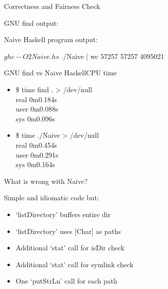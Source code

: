 \documentclass[17pt]{beamer}
\begin{document}
\begin{frame}[fragile]{Correctness and Fairness Check}{}

GNU find output:

Naive Haskell program output:
\begin{code}
$ ghc -O2 Naive.hs
$ ./Naive | wc
57257   57257 4095021
\end{code}
\end{frame}

\begin{frame}{GNU find vs Naive Haskell}{CPU time}

\begin{itemize}
  \item \$ time find . > /dev/null \\
real    0m0.184s \\
user    0m0.088s \\
sys     0m0.096s \\

\item \$ time ./Naive > /dev/null \\
real    0m0.454s \\
user    0m0.291s \\
sys     0m0.164s \\

\end{itemize}
\end{frame}

\begin{frame}{What is wrong with Naive?}{}

Simple and idiomatic code but:
\begin{itemize}
  \item `listDirectory' buffers entire dir
  \item `listDirectory' uses [Char] as paths
  \item Additional `stat' call for isDir check
  \item Additional `stat' call for symlink check
  \item One `putStrLn' call for each path
\end{itemize}
\end{frame}
\end{document}

